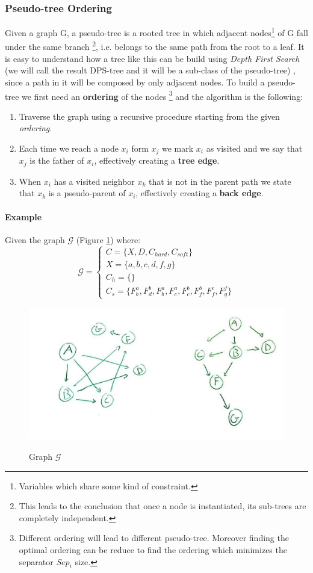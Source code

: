 \documentclass[10pt,a4paper]{article}
\begin{document}
\subsubsection{Pseudo-tree Ordering}
Given a graph G, a pseudo-tree is a rooted tree in which adjacent nodes\footnote{Variables which share some kind of constraint.} of G fall under the same branch \footnote{This leads to the conclusion that once a node is instantiated, its sub-trees are completely independent.}, i.e. belongs to the same path from the root to a leaf. It is easy to understand how a tree like this can be build using \textit{Depth First Search} (we will call the result DPS-tree and it will be a sub-class of the pseudo-tree) , since a path in it will be composed by only adjacent nodes. To build a pseudo-tree we first need an \textbf{ordering} of the nodes \footnote{Different ordering will lead to different pseudo-tree. Moreover finding the optimal ordering can be reduce to find the ordering which minimizes the separator $Sep_i$ size. } and the algorithm is the following:
\begin{enumerate}
\item Traverse the graph using a recursive procedure starting from the given \textit{ordering}.
\item Each time we reach a node $x_i$ form $x_j$ we mark $x_i$ as visited and we say that $x_j$ is the father of $x_i$, effectively creating a \textbf{tree edge}.
\item When $x_i$ has a visited neighbor $x_k$ that is not in the parent path we state that $x_k$ is a pseudo-parent of $x_i$, effectively creating a \textbf{back edge}.
\end{enumerate}

\paragraph{Example}
Given the graph $\mathcal{G}$ (Figure \ref{fig:graph_g}) where:
\[
\mathcal{G} = \begin{cases} C=\{X,D,C_{hard},C_{soft}\} \\
X=\{a,b,c,d,f,g\}\\
C_h=\{\}\\
C_s=\{F^a_b,F^b_d,F^a_b,F^a_c,F^b_c,F^b_f,F^c_f,F^f_g\}
 \end{cases}
\]

\begin{figure}[H]
\centering
\includegraphics[scale=0.25]{images/dfs-tree_1.jpg}\\
\caption{Graph $\mathcal{G}$}
\label{fig:graph_g}
\end{figure}
\end{document}
